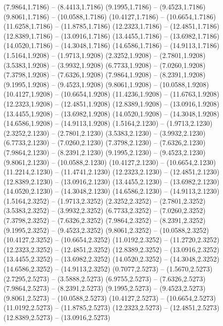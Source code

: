 {\begin{scope}[shift={(#1,#2)}]
    (7.9864,1.7186) -- (8.4413,1.7186)
    (9.1995,1.7186) -- (9.4523,1.7186)
    (9.8061,1.7186) -- (10.0588,1.7186)
    (10.4127,1.7186) -- (10.6654,1.7186)
    (11.6258,1.7186) -- (11.8785,1.7186)
    (12.2323,1.7186) -- (12.4851,1.7186)
    (12.8389,1.7186) -- (13.0916,1.7186)
    (13.4455,1.7186) -- (13.6982,1.7186)
    (14.0520,1.7186) -- (14.3048,1.7186)
    (14.6586,1.7186) -- (14.9113,1.7186)
    (1.5164,1.9208) -- (1.9713,1.9208)
    (2.3252,1.9208) -- (2.7801,1.9208)
    (3.5383,1.9208) -- (3.9932,1.9208)
    (6.7733,1.9208) -- (7.0260,1.9208)
    (7.3798,1.9208) -- (7.6326,1.9208)
    (7.9864,1.9208) -- (8.2391,1.9208)
    (9.1995,1.9208) -- (9.4523,1.9208)
    (9.8061,1.9208) -- (10.0588,1.9208)
    (10.4127,1.9208) -- (10.6654,1.9208)
    (11.4236,1.9208) -- (11.6763,1.9208)
    (12.2323,1.9208) -- (12.4851,1.9208)
    (12.8389,1.9208) -- (13.0916,1.9208)
    (13.4455,1.9208) -- (13.6982,1.9208)
    (14.0520,1.9208) -- (14.3048,1.9208)
    (14.6586,1.9208) -- (14.9113,1.9208)
    (1.5164,2.1230) -- (1.9713,2.1230)
    (2.3252,2.1230) -- (2.7801,2.1230)
    (3.5383,2.1230) -- (3.9932,2.1230)
    (6.7733,2.1230) -- (7.0260,2.1230)
    (7.3798,2.1230) -- (7.6326,2.1230)
    (7.9864,2.1230) -- (8.2391,2.1230)
    (9.1995,2.1230) -- (9.4523,2.1230)
    (9.8061,2.1230) -- (10.0588,2.1230)
    (10.4127,2.1230) -- (10.6654,2.1230)
    (11.2214,2.1230) -- (11.4741,2.1230)
    (12.2323,2.1230) -- (12.4851,2.1230)
    (12.8389,2.1230) -- (13.0916,2.1230)
    (13.4455,2.1230) -- (13.6982,2.1230)
    (14.0520,2.1230) -- (14.3048,2.1230)
    (14.6586,2.1230) -- (14.9113,2.1230)
    (1.5164,2.3252) -- (1.9713,2.3252)
    (2.3252,2.3252) -- (2.7801,2.3252)
    (3.5383,2.3252) -- (3.9932,2.3252)
    (6.7733,2.3252) -- (7.0260,2.3252)
    (7.3798,2.3252) -- (7.6326,2.3252)
    (7.9864,2.3252) -- (8.2391,2.3252)
    (9.1995,2.3252) -- (9.4523,2.3252)
    (9.8061,2.3252) -- (10.0588,2.3252)
    (10.4127,2.3252) -- (10.6654,2.3252)
    (11.0192,2.3252) -- (11.2720,2.3252)
    (12.2323,2.3252) -- (12.4851,2.3252)
    (12.8389,2.3252) -- (13.0916,2.3252)
    (13.4455,2.3252) -- (13.6982,2.3252)
    (14.0520,2.3252) -- (14.3048,2.3252)
    (14.6586,2.3252) -- (14.9113,2.3252)
    (0.7077,2.5273) -- (1.5670,2.5273)
    (2.7295,2.5273) -- (3.5888,2.5273)
    (6.9755,2.5273) -- (7.6326,2.5273)
    (7.9864,2.5273) -- (8.2391,2.5273)
    (9.1995,2.5273) -- (9.4523,2.5273)
    (9.8061,2.5273) -- (10.0588,2.5273)
    (10.4127,2.5273) -- (10.6654,2.5273)
    (11.0192,2.5273) -- (11.8785,2.5273)
    (12.2323,2.5273) -- (12.4851,2.5273)
    (12.8389,2.5273) -- (13.0916,2.5273)

\end{scope}}
